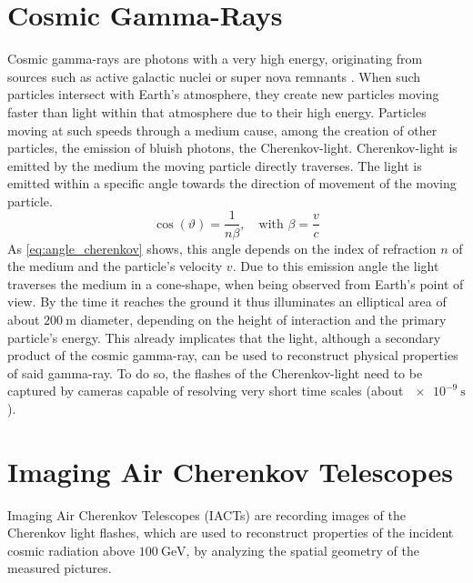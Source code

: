 \section{Cosmic Gamma-Rays}
%
Cosmic gamma-rays are photons with a very high energy, originating from sources such as active galactic nuclei or super nova remnants \cite{FACT-Design}. When such particles intersect
with Earth's atmosphere, they create new particles moving faster than light
within that atmosphere due to their high energy. Particles moving at such
speeds through a medium cause, among the creation of other particles, the
emission of bluish photons, the Cherenkov-light.
Cherenkov-light is emitted by the medium the moving particle directly traverses.
The light is emitted within a specific angle towards the direction of movement of the moving particle.
%
\begin{equation}
    \cos(\vartheta) = \frac{1}{n\beta}, \quad \text{with } \beta=\frac{v}{c}
    \label{eq:angle_cherenkov}
\end{equation}
%
As \autoref{eq:angle_cherenkov} shows, this angle depends on the index of
refraction $n$ of the medium and the particle's velocity $v$. Due to this emission
angle the light traverses the medium in a cone-shape, when being observed from
Earth's point of view. By the time it reaches the ground it thus
illuminates an elliptical area of about $\SI{200}{\meter}$ diameter, depending
on the height of interaction and the primary particle's energy.
This already implicates that the light, although a secondary product of the
cosmic gamma-ray, can be used to reconstruct physical properties of
said gamma-ray. To do so, the flashes of the Cherenkov-light need to
be captured by cameras capable of resolving very short time scales (about
$\SI{e-9}{\second}$).

\section{Imaging Air Cherenkov Telescopes}

Imaging Air Cherenkov Telescopes (IACTs) are recording images of the Cherenkov light flashes, which are used to
reconstruct properties of the incident cosmic radiation above
$\SI{100}{\giga\electronvolt}$, by analyzing the spatial geometry of the
measured pictures.

